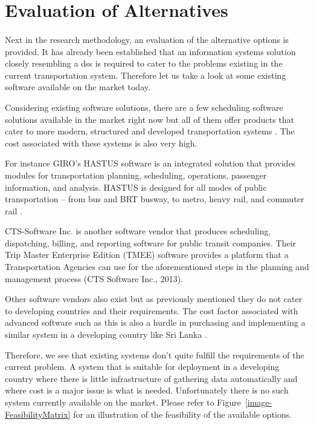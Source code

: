 \section{Evaluation of Alternatives}

\paragraph{} Next in the research methodology, an evaluation of the alternative options is provided. It has already been established that an information systems solution closely resembling a \acrshort{dss} is required to cater to the problems existing in the current transportation system. Therefore let us take a look at some existing software available on the market today.

Considering existing software solutions, there are a few scheduling software solutions available in the market right now but all of them offer products that cater to more modern, structured and developed transportation systems \cite{Trapeze2013a}. The cost associated with these systems is also very high.

For instance GIRO’s HASTUS software is an integrated solution that provides modules for transportation planning, scheduling, operations, passenger information, and analysis. HASTUS is designed for all modes of public transportation – from bus and BRT busway, to metro, heavy rail, and commuter rail \cite{GIRO2013}.

CTS-Software Inc. is another software vendor that produces scheduling, dispatching, billing, and reporting software for public transit companies. Their Trip Master Enterprise Edition (TMEE) software provides a platform that a Transportation Agencies can use for the aforementioned steps in the planning and management process (CTS Software Inc., 2013).

Other software vendors also exist but as previously mentioned they do not cater to developing countries and their requirements. The cost factor associated with advanced software such as this is also a hurdle in purchasing and implementing a similar system in a developing country like Sri Lanka \cite{Trapeze2013b}.

Therefore, we see that existing systems don't quite fulfill the requirements of the current problem. A system that is suitable for deployment in a developing country where there is little infrastructure of gathering data automatically and where cost is a major issue is what is needed. Unfortunately there is no such system currently available on the market. Please refer to Figure~\ref{image-FeasibilityMatrix} for an illustration of the feasibility of the available options.

